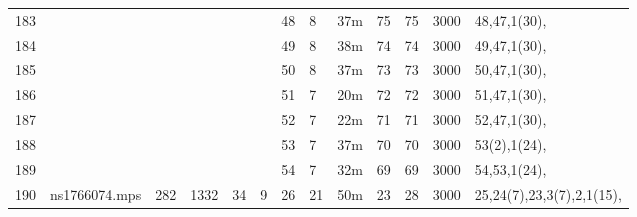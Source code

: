 \documentclass{article}
\begin{document}
\begin{longtable}{|l |l |l |l |l |l |l |l |l |l |l |l |l |}
183&&&&&&48&8&37m&75&75&3000&48,47,1(30),\\
184&&&&&&49&8&38m&74&74&3000&49,47,1(30),\\
185&&&&&&50&8&37m&73&73&3000&50,47,1(30),\\
186&&&&&&51&7&20m&72&72&3000&51,47,1(30),\\
187&&&&&&52&7&22m&71&71&3000&52,47,1(30),\\
188&&&&&&53&7&37m&70&70&3000&53(2),1(24),\\
189&&&&&&54&7&32m&69&69&3000&54,53,1(24),\\
190&ns1766074.mps&282&1332&34&9&26&21&50m&23&28&3000&25,24(7),23,3(7),2,1(15),\\
\hline
\end{longtable}
\end{document}

